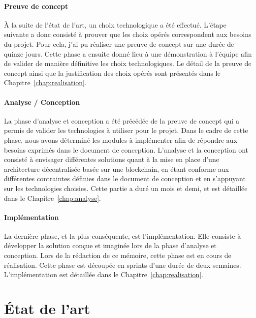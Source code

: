 \documentclass{tnreport}
\begin{document}
\subsubsection{Preuve de concept}

À la suite de l'état de l'art, un choix technologique a été effectué. L'étape suivante a donc consisté à prouver que les choix opérés correspondent aux besoins du projet. Pour cela, j'ai pu réaliser une preuve de concept sur une durée de quinze jours. Cette phase a ensuite donné lieu à une démonstration à l'équipe afin de valider de manière définitive les choix technologiques. Le détail de la preuve de concept ainsi que la justification des choix opérés sont présentés dans le Chapitre~\ref{chap:realisation}.

\subsubsection{Analyse / Conception}

La phase d'analyse et conception a été précédée de la preuve de concept qui a permis de valider les technologies à utiliser pour le projet. Dans le cadre de cette phase, nous avons déterminé les modules à implémenter afin de répondre aux besoins exprimés dans le document de conception. L'analyse et la conception ont consisté à envisager différentes solutions quant à la mise en place d'une architecture décentralisée basée sur une blockchain, en étant conforme aux différentes contraintes définies dans le document de conception et en s'appuyant sur les technologies choisies. Cette partie a duré un mois et demi, et est détaillée dans le Chapitre~\ref{chap:analyse}.

\subsubsection{Implémentation}

La dernière phase, et la plus conséquente, est l'implémentation. Elle consiste à développer la solution conçue et imaginée lors de la phase d'analyse et conception. Lors de la rédaction de ce mémoire, cette phase est en cours de réalisation. Cette phase est découpée en sprints d'une durée de deux semaines. L'implémentation est détaillée dans le Chapitre~\ref{chap:realisation}. 

\chapter{État de l'art}
\label{chap:state-of-the-art}
\end{document}
